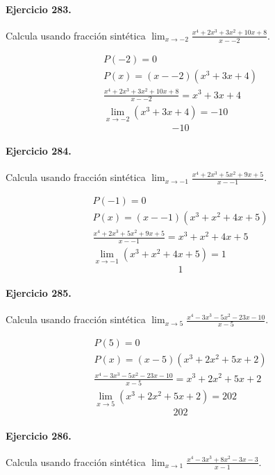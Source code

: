 \documentclass[11pt,a4paper]{article}
\begin{document}
\paragraph{Ejercicio 283.} Calcula usando fracción sintética $\displaystyle\lim_{x\to -2}\frac{x^4 + 2x^3 + 3x^2 + 10x + 8}{x--2}$. 

\[
\begin{aligned}
P(-2)=0\\
P(x)=(x--2)(x^3 + 3x + 4)\\
\frac{x^4 + 2x^3 + 3x^2 + 10x + 8}{x--2}=x^3 + 3x + 4\\
\lim_{x\to -2}(x^3 + 3x + 4)=-10
\end{aligned}
\]
\[\boxed{-10}\]


\paragraph{Ejercicio 284.} Calcula usando fracción sintética $\displaystyle\lim_{x\to -1}\frac{x^4 + 2x^3 + 5x^2 + 9x + 5}{x--1}$. 

\[
\begin{aligned}
P(-1)=0\\
P(x)=(x--1)(x^3 + x^2 + 4x + 5)\\
\frac{x^4 + 2x^3 + 5x^2 + 9x + 5}{x--1}=x^3 + x^2 + 4x + 5\\
\lim_{x\to -1}(x^3 + x^2 + 4x + 5)=1
\end{aligned}
\]
\[\boxed{1}\]


\paragraph{Ejercicio 285.} Calcula usando fracción sintética $\displaystyle\lim_{x\to 5}\frac{x^4 - 3x^3 - 5x^2 - 23x - 10}{x-5}$. 

\[
\begin{aligned}
P(5)=0\\
P(x)=(x-5)(x^3 + 2x^2 + 5x + 2)\\
\frac{x^4 - 3x^3 - 5x^2 - 23x - 10}{x-5}=x^3 + 2x^2 + 5x + 2\\
\lim_{x\to 5}(x^3 + 2x^2 + 5x + 2)=202
\end{aligned}
\]
\[\boxed{202}\]


\paragraph{Ejercicio 286.} Calcula usando fracción sintética $\displaystyle\lim_{x\to 1}\frac{x^4 - 3x^3 + 8x^2 - 3x - 3}{x-1}$. 
\end{document}
